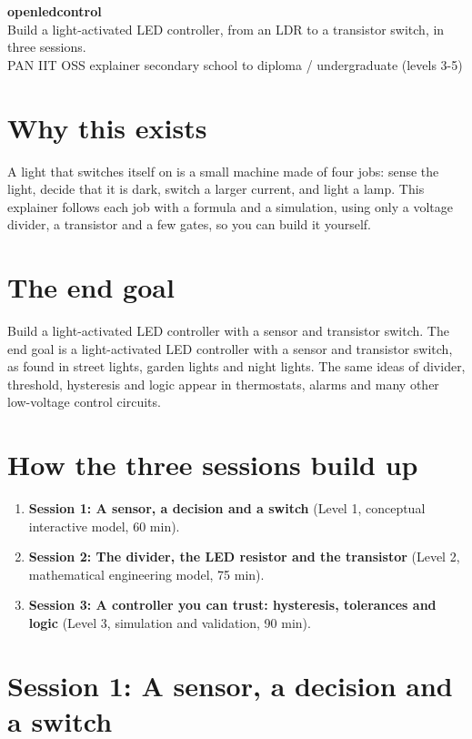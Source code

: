 \documentclass[11pt,a4paper]{article}
\begin{document}
\begin{center}{\LARGE\bfseries openledcontrol}\\[0.4em]{\large Build a light-activated LED controller, from an LDR to a transistor switch, in three sessions.}\\[0.2em]\small PAN IIT OSS explainer \textbullet{} secondary school to diploma / undergraduate (levels 3-5)\end{center}

\section*{Why this exists}
A light that switches itself on is a small machine made of four jobs: sense the light, decide that it is dark, switch a larger current, and light a lamp. This explainer follows each job with a formula and a simulation, using only a voltage divider, a transistor and a few gates, so you can build it yourself.

\section*{The end goal}
Build a light-activated LED controller with a sensor and transistor switch. The end goal is a light-activated LED controller with a sensor and transistor switch, as found in street lights, garden lights and night lights. The same ideas of divider, threshold, hysteresis and logic appear in thermostats, alarms and many other low-voltage control circuits.

\section*{How the three sessions build up}
\begin{enumerate}[nosep]
\item \textbf{Session 1: A sensor, a decision and a switch} (Level 1, conceptual interactive model, 60 min).
\item \textbf{Session 2: The divider, the LED resistor and the transistor} (Level 2, mathematical engineering model, 75 min).
\item \textbf{Session 3: A controller you can trust: hysteresis, tolerances and logic} (Level 3, simulation and validation, 90 min).
\end{enumerate}

\section{Session 1: A sensor, a decision and a switch}
\end{document}
